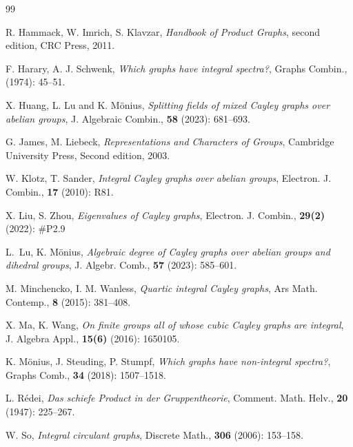 \documentclass[12pt,a4paper]{article}
\begin{document}
\begin{thebibliography}{99}
		
		
		R. Hammack, W. Imrich, S. Klavzar, {\it Handbook of Product Graphs}, second edition, CRC Press, 2011.
		
		F. Harary, A. J. Schwenk, {\it Which graphs have integral spectra?}, Graphs Combin., (1974): 45--51.
		
		X. Huang, L. Lu and K. M\"{o}nius, {\it Splitting fields of mixed Cayley graphs over abelian groups}, J. Algebraic Combin., {\bf 58} (2023): 681--693.
		
		
		
		G. James, M. Liebeck, {\it Representations and Characters of Groups}, Cambridge University Press, Second edition, 2003.
		
		W. Klotz, T. Sander, {\it Integral Cayley graphs over abelian groups}, Electron. J. Combin., {\bf 17} (2010): R81.
		
		X. Liu, S. Zhou, {\it Eigenvalues of Cayley graphs}, Electron. J. Combin., {\bf 29(2)} (2022): \#P2.9
		
		L.~Lu, K. M\"{o}nius, {\it Algebraic degree of Cayley graphs over abelian groups and dihedral groups}, J. Algebr. Comb., {\bf 57} (2023): 585--601.
		
		
		
		 M. Minchencko, I. M. Wanless, {\it Quartic integral Cayley graphs}, Ars Math. Contemp., {\bf 8} (2015): 381--408.
		
		
			X. Ma, K. Wang, {\it On finite groups all of whose cubic Cayley graphs are integral}, J. Algebra Appl., {\bf 15(6)} (2016): 1650105.
			
		
		
		K. M\"{o}nius, J. Steuding, P. Stumpf, {\it Which graphs have non-integral spectra?}, Graphs Comb., {\bf 34} (2018): 1507--1518.
		
		
			L. R\'{e}dei, {\it Das schiefe Product in der Gruppentheorie}, Comment. Math. Helv., {\bf 20} (1947): 225--267.
		
		W. So, {\it Integral circulant graphs}, Discrete Math., {\bf 306} (2006): 153--158.
		

\end{thebibliography}
\end{document}
